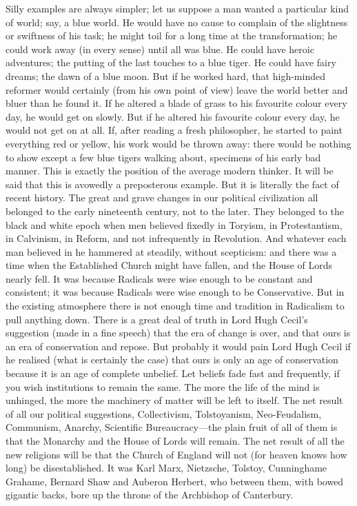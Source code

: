 \documentclass{book}
\begin{document}
Silly examples are always simpler; let us suppose a man wanted a particular kind of world; say, a blue world. He would have no cause to complain of the slightness or swiftness of his task; he might toil for a long time at the transformation; he could work away (in every sense) until all was blue. He could have heroic adventures; the putting of the last touches to a blue tiger. He could have fairy dreams; the dawn of a blue moon. But if he worked hard, that high-minded reformer would certainly (from his own point of view) leave the world better and bluer than he found it. If he altered a blade of grass to his favourite colour every day, he would get on slowly. But if he altered his favourite colour every day, he would not get on at all. If, after reading a fresh philosopher, he started to paint everything red or yellow, his work would be thrown away: there would be nothing to show except a few blue tigers walking about, specimens of his early bad manner. This is exactly the position of the average modern thinker. It will be said that this is avowedly a preposterous example. But it is literally the fact of recent history. The great and grave changes in our political civilization all belonged to the early nineteenth century, not to the later. They belonged to the black and white epoch when men believed fixedly in Toryism, in Protestantism, in Calvinism, in Reform, and not infrequently in Revolution. And whatever each man believed in he hammered at steadily, without scepticism: and there was a time when the Established Church might have fallen, and the House of Lords nearly fell. It was because Radicals were wise enough to be constant and consistent; it was because Radicals were wise enough to be Conservative. But in the existing atmosphere there is not enough time and tradition in Radicalism to pull anything down. There is a great deal of truth in Lord Hugh Cecil’s suggestion (made in a fine speech) that the era of change is over, and that ours is an era of conservation and repose. But probably it would pain Lord Hugh Cecil if he realised (what is certainly the case) that ours is only an age of conservation because it is an age of complete unbelief. Let beliefs fade fast and frequently, if you wish institutions to remain the same. The more the life of the mind is unhinged, the more the machinery of matter will be left to itself. The net result of all our political suggestions, Collectivism, Tolstoyanism, Neo-Feudalism, Communism, Anarchy, Scientific Bureaucracy—the plain fruit of all of them is that the Monarchy and the House of Lords will remain. The net result of all the new religions will be that the Church of England will not (for heaven knows how long) be disestablished. It was Karl Marx, Nietzsche, Tolstoy, Cunninghame Grahame, Bernard Shaw and Auberon Herbert, who between them, with bowed gigantic backs, bore up the throne of the Archbishop of Canterbury.
\end{document}

